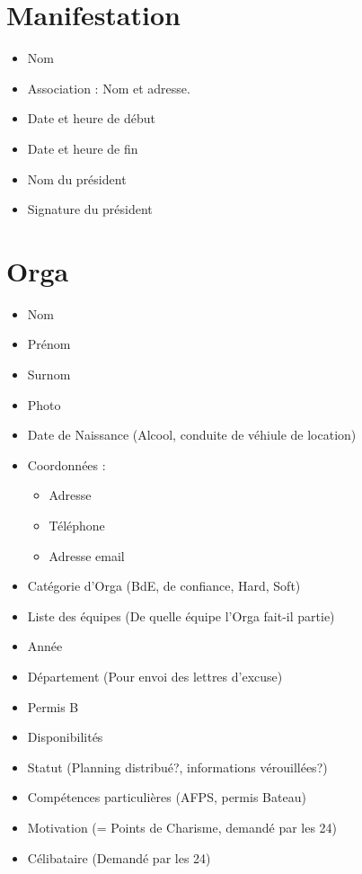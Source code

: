 \section{Manifestation}
\begin{itemize}
 \item Nom
\item Association : Nom et adresse.
\item Date et heure de début
\item Date et heure de fin
\item Nom du président
\item Signature du président

\end{itemize}

\section{Orga}
\begin{itemize}
 \item Nom
\item Prénom
\item Surnom
\item Photo

\item Date de Naissance (Alcool, conduite de véhiule de location)

\item Coordonnées : \begin{itemize}
                     \item Adresse
\item Téléphone
\item Adresse email
                    \end{itemize}
\item Catégorie d'Orga (BdE, de confiance, Hard, Soft)
\item Liste des équipes (De quelle équipe l'Orga fait-il partie)
\item Année
\item Département (Pour envoi des lettres d'excuse)
\item Permis B

\item Disponibilités
\item Statut (Planning distribué?, informations vérouillées?)
\item Compétences particulières (AFPS, permis Bateau)

\item Motivation (= Points de Charisme, demandé par les 24)
\item Célibataire (Demandé par les 24)

\end{itemize}

